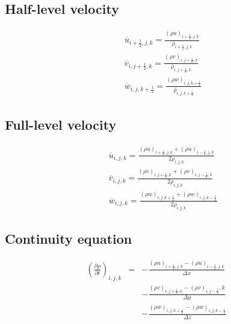 \subsection{Half-level velocity}
\begin{eqnarray}
&&  \overline{u}_{i+\frac{1}{2},j,k} = \frac{(\rho u)_{i+\frac{1}{2},j,k}}{\overline{\rho}_{i+\frac{1}{2},j,k}}\\
&&  \overline{v}_{i,j+\frac{1}{2},k} = \frac{(\rho v)_{i,j+\frac{1}{2},k}}{\overline{\rho}_{i,j+\frac{1}{2},k}}\\
&&  \overline{w}_{i,j,k+\frac{1}{2}} = \frac{(\rho w)_{i,j,k+\frac{1}{2}}}{\overline{\rho}_{i,j,k+\frac{1}{2}}}
\end{eqnarray}

\subsection{Full-level velocity}
\begin{eqnarray}
&&  \overline{u}_{i,j,k} = \frac{(\rho u)_{i+\frac{1}{2},j,k}+(\rho u)_{i-\frac{1}{2},j,k}}{2\rho_{i,j,k}}\\
&&  \overline{v}_{i,j,k} = \frac{(\rho v)_{i,j+\frac{1}{2},k}+(\rho v)_{i,j-\frac{1}{2},k}}{2\rho_{i,j,k}}\\
&&  \overline{w}_{i,j,k} = \frac{(\rho w)_{i,j,k+\frac{1}{2}}+(\rho w)_{i,j,k-\frac{1}{2}}}{2\rho_{i,j,k}}
\end{eqnarray}

\subsection{Continuity equation}
\begin{eqnarray}
\left(\frac{\partial \rho}{\partial t}\right)_{i,j,k}
&=& - \frac{(\rho u)_{i+\frac{1}{2},j,k} -(\rho u)_{i-\frac{1}{2},j,k}}{\Delta x}\nonumber\\
& & - \frac{(\rho v)_{i,j+\frac{1}{2},k} -(\rho v)_{i,j-\frac{1}{2}},k}{\Delta y}\nonumber\\
& & - \frac{(\rho w)_{i,j,k+\frac{1}{2}} -(\rho w)_{i,j,k-\frac{1}{2}}}{\Delta z}
\end{eqnarray}

